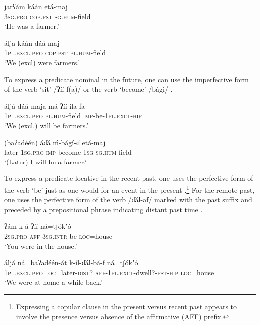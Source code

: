 \documentclass[output=paper]{langsci/langscibook}
\begin{document}
\ea\label{ex:ahlandc:75}
\gll
jarʕám  káán  etá-maj  \\
\textsc{3sg.pro}    \textsc{cop.pst}  \textsc{sg.hum}{}-field\\
\glt
‘He was a farmer.’
\z

\ea\label{ex:ahlandc:76}
\gll
álja    káán    dáá-maj\\
\textsc{1pl.excl.pro}   \textsc{cop.pst}    \textsc{pl.hum}{}-field\\
\glt
‘We (excl) were farmers.’
\z

To express a predicate nominal in the future, one can use the imperfective form of the verb ‘sit’ /ʔíí-f(a)/  or the verb ‘become’ /bági/ .

\ea\label{ex:ahlandc:77}
\gll
áljá      dáá-maja  má-ʔíí-íla-fa\\
\textsc{1pl.excl.pro}    \textsc{pl.hum}{}-field   \textsc{imp}{}-be-\textsc{1pl.excl-hip}\\
\glt
‘We (excl.) will be farmers.’
\z

\ea\label{ex:ahlandc:78}
\gll
(baʔadéén) áɗá          \'{m}-bágí-ɗ     etá-maj \\
later           \textsc{1sg.pro}   \textsc{imp}{}-become-\textsc{1sg}   \textsc{sg.hum}{}-field\\
 \glt
 ‘(Later) I will be a farmer.‘  
\z

To express a predicate locative in the recent past, one uses the perfective form of the verb ‘be’ just as one would for an event in the present .\footnote{Expressing a copular clause in the present versus recent past appears to involve the presence versus absence of the affirmative (AFF) prefix.} For the remote past, one uses the perfective form of the verb /ɗál-af/ marked with the past suffix and preceded by a prepositional phrase indicating distant past time .

\ea\label{ex:ahlandc:79}
\gll
ʔám         k-á-ʔíí                    ná=tʃ\'{o}kʼ\'{o}\\
\textsc{2sg}\textsc{.pro}   \textsc{aff-3sg.intr}{}-be  \textsc{loc}=house\\
\glt
‘You were in the house.’
\z

\ea\label{ex:ahlandc:80}
\gll
áljá    ná=baʔadéén-át  k-íl-ɗál-bá-f       ná=tʃ\'{o}kʼ\'{o}\\
\textsc{1pl.excl.pro}   \textsc{loc}=later-\textsc{dist?}      \textsc{aff-1pl.excl}{}-dwell?-\textsc{pst-hip}  \textsc{loc}=house\\
\glt
‘We were at home a while back.’
\z
\end{document}
